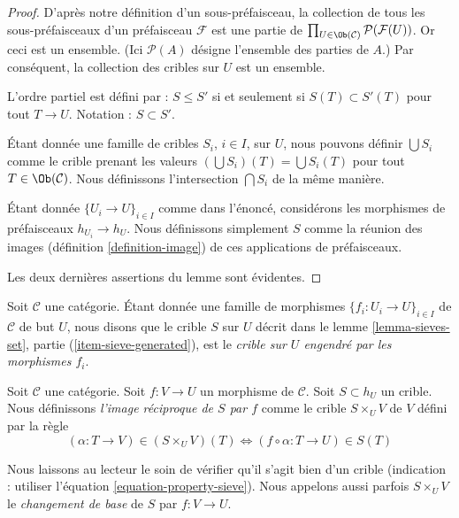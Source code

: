 \begin{proof}
D'après notre définition d'un sous-préfaisceau, la collection de
tous les sous-préfaisceaux d'un préfaisceau $\mathcal{F}$ est une partie de
$\prod_{U \in \Ob(\mathcal{C})} \mathcal{P}(\mathcal{F}(U))$.
Or ceci est un ensemble. (Ici $\mathcal{P}(A)$ désigne
l'ensemble des parties de $A$.) Par conséquent, la collection des cribles sur $U$
est un ensemble.

\medskip\noindent
L'ordre partiel est défini par : $S \leq S'$ si et seulement si
$S(T) \subset S'(T)$ pour tout $T \to U$. Notation : $S \subset S'$.

\medskip\noindent
Étant donnée une famille de cribles $S_i$, $i \in I$, sur $U$, nous pouvons
définir $\bigcup S_i$ comme le crible prenant les valeurs
$(\bigcup S_i)(T) = \bigcup S_i(T)$ pour tout
$T \in \Ob(\mathcal{C})$.
Nous définissons l'intersection $\bigcap S_i$ de la même manière.

\medskip\noindent
Étant donnée $\{U_i \to U\}_{i\in I}$ comme dans l'énoncé, considérons
les morphismes de préfaisceaux $h_{U_i} \to h_U$. Nous définissons simplement
$S$ comme la réunion des images (définition \ref{definition-image})
de ces applications de préfaisceaux.

\medskip\noindent
Les deux dernières assertions du lemme sont évidentes.
\end{proof}

\begin{definition}
\label{definition-sieve-generated}
Soit $\mathcal{C}$ une catégorie.
Étant donnée une famille de morphismes $\{f_i : U_i \to U\}_{i\in I}$
de $\mathcal{C}$ de but $U$, nous disons que le crible
$S$ sur $U$ décrit dans le lemme \ref{lemma-sieves-set},
partie (\ref{item-sieve-generated}), est le {\it crible sur $U$
engendré par les morphismes $f_i$}.
\end{definition}

\begin{definition}
\label{definition-pullback-sieve}
Soit $\mathcal{C}$ une catégorie.
Soit $f : V \to U$ un morphisme de $\mathcal{C}$.
Soit $S \subset h_U$ un crible. Nous définissons
{\it l'image réciproque de $S$ par $f$} comme le crible
$S \times_U V$ de $V$ défini par la règle
$$
(\alpha : T \to V) \in (S \times_U V)(T)
\Leftrightarrow
(f \circ \alpha : T \to U) \in S(T)
$$
\end{definition}

\noindent
Nous laissons au lecteur le soin de vérifier qu'il s'agit bien d'un crible
(indication : utiliser l'équation \ref{equation-property-sieve}).
Nous appelons aussi parfois $S \times_U V$ le {\it changement de base}
de $S$ par $f : V \to U$.

